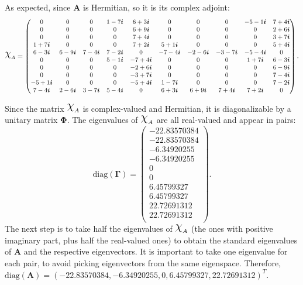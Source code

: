 As expected, since $ \mathbf{A}$ is Hermitian, so it is its complex adjoint:
\begin{equation}
\small
\rchi_A = 
\begin{pmatrix}
0 &  0 &  0 &  1 -7 \qi &  6 +3 \qi &  0 &  0 & 0 & -5 -1 \qi &  7 +4 \qi \\
0 &  0 &  0 &  0 &  6 +9 \qi &  0 &  0 & 0 &  0 &  2 +6 \qi \\
0 &  0 &  0 &  0 &  7 +4 \qi &  0 &  0 & 0 &  0 &  3 +7 \qi \\
1 +7 \qi &  0 &  0 &  0 &  7 +2 \qi &  5 +1 \qi &  0 & 0 &  0 &  5 +4 \qi \\
6 -3 \qi &  6 -9 \qi &  7 -4 \qi &  7 -2 \qi &  0 & -7 -4 \qi & -2 -6 \qi & -3 -7 \qi & -5 -4 \qi &  0 \\
0 & 0 & 0 &  5 -1 \qi & -7 +4 \qi &  0 &  0 & 0 &  1 +7 \qi &  6 -3 \qi \\
0 & 0 & 0 & 0 & -2 +6 \qi &  0 &  0 & 0 &  0 &  6 -9 \qi \\
0 & 0 & 0 & 0 & -3 +7 \qi &  0 &  0 & 0 &  0 &  7 -4 \qi \\
-5 +1 \qi & 0 & 0 & 0 & -5 +4 \qi &  1 -7 \qi &  0 & 0 &  0 &  7 -2 \qi \\
7 -4 \qi &  2 -6 \qi &  3 -7 \qi &  5 -4 \qi & 0 &  6 +3 \qi &  6 +9 \qi & 7 +4 \qi &  7 +2 \qi &  0
\end{pmatrix}.
\end{equation}

Since the matrix $\rchi_A$ is complex-valued and Hermitian, it is diagonalizable by a unitary matrix $\mathbf{\Phi}$. The eigenvalues of $\rchi_A$ are all real-valued and appear in pairs:
\begin{equation}
\mathrm{diag}(\mathbf{\Gamma}) = \begin{pmatrix}
-22.83570384 \\
-22.83570384 \\
-6.34920255 \\
-6.34920255 \\
0 \\
0 \\
6.45799327 \\
6.45799327 \\
22.72691312 \\
22.72691312 \\
\end{pmatrix}.
\end{equation}
The next step is to take half the eigenvalues of $\rchi_A$ (the ones with positive imaginary part, plus half the real-valued ones) to obtain the standard eigenvalues of $\mathbf{A}$ and the respective eigenvectors. It is important to take one eigenvalue for each pair, to avoid picking eigenvectors from the same eigenspace. Therefore, $\mathrm{diag}(\mathbf{A}) = (-22.83570384, -6.34920255, 0, 6.45799327, 22.72691312)^T$.

